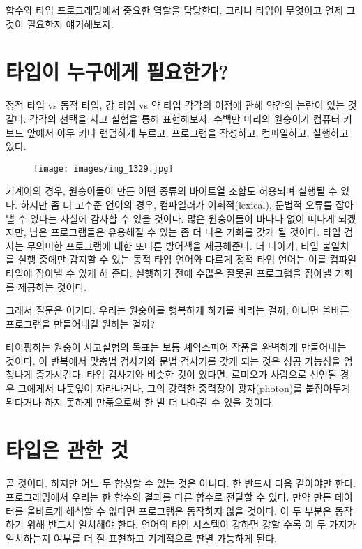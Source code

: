 
\lettrine[lhang=0.17]{함}{수}와 타입 \trCategory\는  프로그래밍에서 중요한 역할을 담당한다. 그러니 타입이 무엇이고 언제 그것이 필요한지 얘기해보자.

\section{타입이 누구에게 필요한가?}

정적 타입 vs 동적 타입, 강 타입 vs 약 타입 각각의 이점에 관해 약간의 논란이 있는 것 같다.
각각의 선택을 사고 실험을 통해 표현해보자. 수백만 마리의 원숭이가 컴퓨터 키보드 앞에서 아무 키나 랜덤하게 누르고, 프로그램을 작성하고, 컴파일하고, 실행하고 있다.

\begin{figure}[H]
\centering
\texttt{[image: images/img\_1329.jpg]}
\end{figure}

\noindent
기계어의 경우, 원숭이들이 만든 어떤 종류의 바이트열 조합도 허용되며 실행될 수 있다.
하지만 좀 더 고수준 언어의 경우, 컴파일러가 어휘적(lexical), 문법적 오류를 잡아낼 수 있다는 사실에 감사할 수 있을 것이다.
많은 원숭이들이 바나나 없이 떠나게 되겠지만, 남은 프로그램들은 유용해질 수 있는 좀 더 나은 기회를 갖게 될 것이다.
타입 검사는 무의미한 프로그램에 대한 또다른 방어책을 제공해준다.
더 나아가, 타입 불일치를 실행 중에만 감지할 수 있는 동적 타입 언어와 다르게 정적 타입 언어는 이를 컴파일 타임에 잡아낼 수 있게 해 준다.
실행하기 전에 수많은 잘못된 프로그램을 잡아낼 기회를 제공하는 것이다.

그래서 질문은 이거다. 우리는 원숭이를 행복하게 하기를 바라는 걸까, 아니면 올바른 프로그램을 만들어내길 원하는 걸까?

타이핑하는 원숭이 사고실험의 목표는 보통 셰익스피어 작품을 완벽하게 만들어내는 것이다.
이 반복에서 맞춤법 검사기와 문법 검사기를 갖게 되는 것은 성공 가능성을 엄청나게 증가시킨다.
타입 검사기와 비슷한 것이 있다면, 로미오가 사람으로 선언될 경우 그에게서 나뭇잎이 자라나거나, 그의 강력한 중력장이 광자(photon)를 붙잡아두게 된다거나 하지 못하게 만듦으로써 한 발 더 나아갈 수 있을 것이다.

\section{타입은  관한 것}

\trCategoryTheory{} 곧 \trArrow\를  것이다. 하지만 어느 두  합성할 수 있는 것은 아니다. 
한  \trTargetObject\는 반드시 다음  \trSourceObject\와 같아야만 한다.
프로그래밍에서 우리는 한 함수의 결과를 다른 함수로 전달할 수 있다.
만약 \trTargetFunction\이  만든 데이터를 올바르게 해석할 수 없다면 프로그램은 동작하지 않을 것이다.
이 두 부분은 \trComposition\이 동작하기 위해 반드시 일치해야 한다.
언어의 타입 시스템이 강하면 강할 수록 이 두 가지가 일치하는지 여부를 더 잘 표현하고 기계적으로 판별 가능하게 된다.

